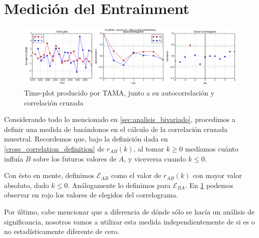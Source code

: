 \section{Medición del Entrainment}
\label{sec:method_entrainment}

\newcommand{\fwentrainment}[1] {\mathcal{E}_{#1}}

\begin{figure}
\centering
\includegraphics[width=15cm]{images/time_plot_with_cross_correlation.png}
\caption{Time-plot producido por TAMA, junto a su autocorrelación y correlación cruzada\label{fig:time_plot_with_bivariate}}
\end{figure}

Considerando todo lo mencionado en \ref{sec:analisis_bivariado}, procedimos a definir una medida de \entrainment basándonos en el cálculo de la correlación cruzada muestral. Recordemos que, bajo la definición dada en \ref{cross_correlation_definition} de $r_{AB}(k)$, al tomar $k \geq 0$ medíamos cuánto influía $B$ sobre los futuros valores de $A$, y viceversa cuando $k \leq 0$.

Con ésto en mente, definimos $\fwentrainment{AB}$ como el valor de $r_{AB}(k)$ con mayor valor absoluto, dado $k \leq 0$. Análogamente lo definimos para $\fwentrainment{BA}$. En \ref{fig:time_plot_with_bivariate} podemos observar en rojo los valores de \entrainment elegidos del correlograma.

Por último, cabe mencionar que a diferencia de \cite{KOU2008.2} dónde sólo se hacía un análisis de significancia, nosotros vamos a utilizar esta medida independientemente de si es o no estadísticamente diferente de cero.
